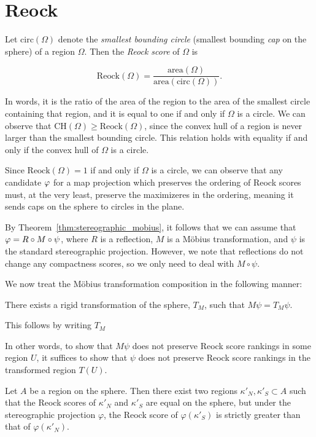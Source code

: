 \section{Reock}\label{sec:reock}

Let $\mathrm{circ}(\Omega)$ denote the \textit{smallest bounding
circle} (smallest bounding \textit{cap} on the sphere) of a region
$\Omega$.  Then the \textit{Reock score} of $\Omega$ is 

$$\mathrm{Reock}(\Omega)=
\frac{\mathrm{area}(\Omega)}{\mathrm{area}(\mathrm{circ}(\Omega))}.$$

In words, it is the ratio of the area of the region to the area of the
smallest circle containing that region, and it is equal to one if and
only if $\Omega$ is a circle.  We can observe that
$\mathrm{CH}(\Omega)\geq \mathrm{Reock}(\Omega)$, since the convex
hull of a region is never larger than the smallest bounding circle.
This relation holds with equality if and only if the convex hull of
$\Omega$ is a circle.  

Since $\mathrm{Reock}(\Omega)=1$ if and only if $\Omega$ is a circle,
we can observe that any candidate $\varphi$ for a map projection 
which preserves the ordering of Reock scores must, at the 
very least, preserve the maximizeres in the ordering, meaning 
it sends caps on the sphere to circles in the plane.  

By Theorem~\ref{thm:stereographic_mobius}, it follows that 
we can assume that $\varphi=R\circ M \circ \psi$, 
where $R$ is a reflection, $M$ is a M\"{o}bius 
transformation, and $\psi$ is the standard 
stereographic projection. However, we note that reflections do not 
change any compactness scores, so we only need 
to deal with $M\circ \psi$.

We now treat the M\"{o}bius transformation composition 
in the following manner:
\begin{claim}
  There exists a rigid transformation of the 
  sphere, $T_M$, such that $M\psi = T_M\psi$.
\end{claim}
This follows by writing $T_M$

In other words, to show that $M\psi$ 
does not preserve Reock score rankings 
in some region $U$, it suffices to show that 
$\psi$ does not preserve Reock score 
rankings in the transformed region 
$T(U)$.

\begin{theorem}\label{thm:reock}
  Let $A$ be a region on the sphere.  Then there exist two regions
  $\kappa'_N,\kappa'_S\subset A$ such that the Reock scores of
  $\kappa'_N$ and $\kappa'_S$ are equal on the sphere, but under the
  stereographic projection $\varphi$, the Reock score of $\varphi(\kappa'_S)$
  is strictly greater than that of $\varphi(\kappa'_N)$. 
\end{theorem}


